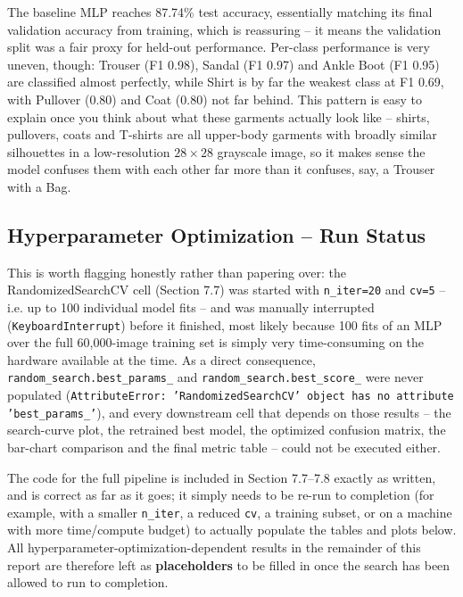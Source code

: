 \documentclass[11pt]{article}
\begin{document}
The baseline MLP reaches 87.74\% test accuracy, essentially matching its final validation accuracy from training, which is reassuring -- it means the validation split was a fair proxy for held-out performance. Per-class performance is very uneven, though: Trouser (F1 0.98), Sandal (F1 0.97) and Ankle Boot (F1 0.95) are classified almost perfectly, while Shirt is by far the weakest class at F1 0.69, with Pullover (0.80) and Coat (0.80) not far behind. This pattern is easy to explain once you think about what these garments actually look like -- shirts, pullovers, coats and T-shirts are all upper-body garments with broadly similar silhouettes in a low-resolution $28 \times 28$ grayscale image, so it makes sense the model confuses them with each other far more than it confuses, say, a Trouser with a Bag.

\subsection{Hyperparameter Optimization -- Run Status}
This is worth flagging honestly rather than papering over: the RandomizedSearchCV cell (Section 7.7) was started with \texttt{n\_iter=20} and \texttt{cv=5} -- i.e. up to 100 individual model fits -- and was manually interrupted (\texttt{KeyboardInterrupt}) before it finished, most likely because 100 fits of an MLP over the full 60,000-image training set is simply very time-consuming on the hardware available at the time. As a direct consequence, \texttt{random\_search.best\_params\_} and \texttt{random\_search.best\_score\_} were never populated (\texttt{AttributeError: 'RandomizedSearchCV' object has no attribute 'best\_params\_'}), and every downstream cell that depends on those results -- the search-curve plot, the retrained best model, the optimized confusion matrix, the bar-chart comparison and the final metric table -- could not be executed either.

The code for the full pipeline is included in Section 7.7--7.8 exactly as written, and is correct as far as it goes; it simply needs to be re-run to completion (for example, with a smaller \texttt{n\_iter}, a reduced \texttt{cv}, a training subset, or on a machine with more time/compute budget) to actually populate the tables and plots below. All hyperparameter-optimization-dependent results in the remainder of this report are therefore left as \textbf{placeholders} to be filled in once the search has been allowed to run to completion.

\end{document}
